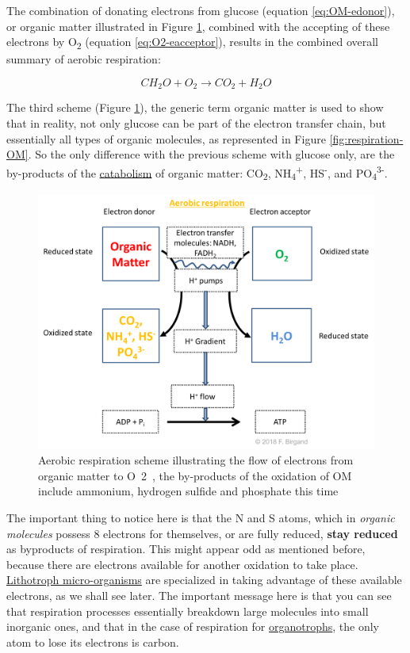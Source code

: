 \documentclass[]{book}
\theoremstyle{definition}
\theoremstyle{definition}
\theoremstyle{definition}
\theoremstyle{remark}
\begin{document}
The combination of donating electrons from glucose (equation
\eqref{eq:OM-edonor}), or organic matter illustrated in Figure
\ref{fig:aerobic-resp-scheme-OM}, combined with the accepting of these
electrons by O\textsubscript{2} (equation \eqref{eq:O2-eacceptor}),
results in the combined overall summary of aerobic respiration:

\begin{equation}
 CH_2O + O_2 \rightarrow CO_2 + H_2O  
\label{eq:sum-resp-OM-O2}
\end{equation}

The third scheme (Figure \ref{fig:aerobic-resp-scheme-OM}), the generic
term organic matter is used to show that in reality, not only glucose
can be part of the electron transfer chain, but essentially all types of
organic molecules, as represented in Figure \ref{fig:respiration-OM}. So
the only difference with the previous scheme with glucose only, are the
by-products of the \protect\hyperlink{catabolism}{catabolism} of organic
matter: CO\textsubscript{2}, NH\textsubscript{4}\textsuperscript{+},
HS\textsuperscript{-}, and PO\textsubscript{4}\textsuperscript{3-}.

\begin{figure}

{\centering \includegraphics[width=0.75\linewidth]{pictures/respiration-OM-O2} 

}

\caption{Aerobic respiration scheme illustrating the flow of electrons from organic matter to O~2~, the by-products of the oxidation of OM include ammonium, hydrogen sulfide and phosphate this time}\label{fig:aerobic-resp-scheme-OM}
\end{figure}

The important thing to notice here is that the N and S atoms, which in
\emph{organic molecules} possess 8 electrons for themselves, or are
fully reduced, \textbf{stay reduced} as byproducts of respiration. This
might appear odd as mentioned before, because there are electrons
available for another oxidation to take place.
\protect\hyperlink{trophic-names}{Lithotroph micro-organisms} are
specialized in taking advantage of these available electrons, as we
shall see later. The important message here is that you can see that
respiration processes essentially breakdown large molecules into small
inorganic ones, and that in the case of respiration for
\protect\hyperlink{trophic-names}{organotrophs}, the only atom to lose
its electrons is carbon.
\end{document}
